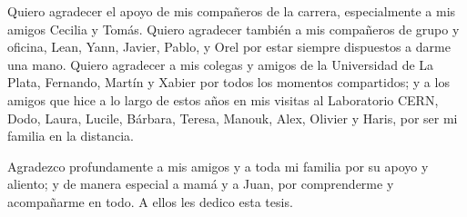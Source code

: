 \documentclass[11pt,a4paper,12pt]{report}
\begin{document}
Quiero agradecer el apoyo de mis compa\~neros de la carrera, especialmente a mis amigos Cecilia y Tom\'as. Quiero agradecer tambi\'en a mis  compa\~neros de grupo y oficina, Lean, Yann, Javier, Pablo, y Orel por estar siempre dispuestos a darme una mano.  Quiero agradecer a mis colegas y amigos de la Universidad de La Plata, Fernando, Mart\'in y Xabier por todos los momentos compartidos; y a los amigos que hice a lo largo de estos a\~nos en mis visitas al Laboratorio CERN, Dodo, Laura, Lucile, B\'arbara, Teresa, Manouk, Alex, Olivier y Haris, por ser mi familia en la distancia. %

Agradezco profundamente a mis amigos y a toda mi familia por su apoyo y aliento; y de manera especial a mam\'a y a Juan, por comprenderme y acompa\~narme en todo. A ellos les dedico esta tesis. %




\end{document}

